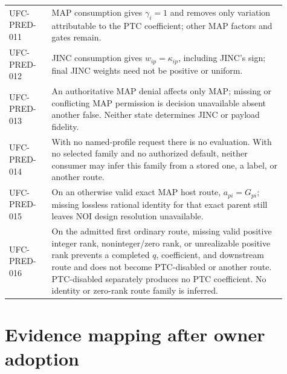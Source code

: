 \begin{longtable}{p{0.14\linewidth}p{0.77\linewidth}}
UFC-PRED-011 & MAP consumption gives \(\gamma_i=1\) and removes only variation
attributable to the PTC coefficient; other MAP factors and gates remain.\\
UFC-PRED-012 & JINC consumption gives \(w_{ip}=\kappa_{ip}\), including JINC's
sign; final JINC weights need not be positive or uniform.\\
UFC-PRED-013 & An authoritative MAP denial affects only MAP; missing or
conflicting MAP permission is decision unavailable absent another false.
Neither state determines JINC or payload fidelity.\\
UFC-PRED-014 & With no named-profile request there is no evaluation. With no
selected family and no authorized default, neither consumer may infer this
family from a stored one, a label, or another route.\\
UFC-PRED-015 & On an otherwise valid exact MAP host route,
\(a_{pi}=G_{pi}\); missing lossless rational identity for that exact parent
still leaves NOI design resolution unavailable.\\
UFC-PRED-016 & On the admitted first ordinary route, missing valid positive
integer rank, noninteger/zero rank, or unrealizable positive rank prevents a
completed \(q\), coefficient, and downstream route and does not become
PTC-disabled or another route. PTC-disabled separately produces no PTC
coefficient. No identity or zero-rank route family is inferred.\\
\bottomrule
\end{longtable}

\section{Evidence mapping after owner adoption}

